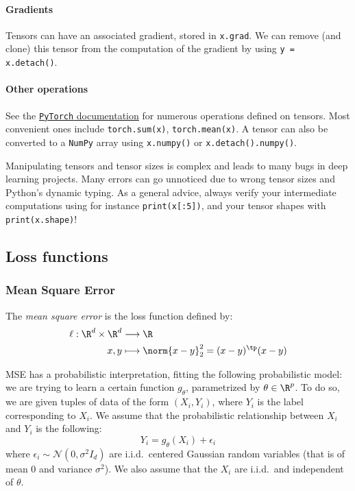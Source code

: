 \paragraph*{Gradients}
Tensors can have an associated gradient, stored in \texttt{x.grad}. We can remove (and clone) this tensor from the computation of the gradient by using \texttt{y = x.detach()}.

\paragraph*{Other operations}
See the \href{https://pytorch.org/docs/stable/tensors.html}{\texttt{PyTorch} documentation} for numerous operations defined on tensors. Most convenient ones include \texttt{torch.sum(x)}, \texttt{torch.mean(x)}. A tensor can also be converted to a \texttt{NumPy} array using \texttt{x.numpy()} or \texttt{x.detach().numpy()}.

Manipulating tensors and tensor sizes is complex and leads to many bugs in deep learning projects. Many errors can go unnoticed due to wrong tensor sizes and Python's dynamic typing. As a general advice, always verify your intermediate computations using for instance \texttt{print(x[:5])}, and your tensor shapes with \texttt{print(x.shape)}!

\subsection{Loss functions}
\subsubsection{Mean Square Error}
\begin{definition}
    The \emph{mean square error} is the loss function defined by:
    \begin{equation*}
        \begin{aligned}
            \ell : \R^d\times\R^d&\longrightarrow\R\\
            x, y&\longmapsto \norm{x-y}_2^2 = (x-y)^\tp(x-y)
        \end{aligned}
    \end{equation*}
\end{definition}

MSE has a probabilistic interpretation, fitting the following probabilistic model: we are trying to learn a certain function $g_\theta$, parametrized by $\theta\in\R^p$. To do so, we are given tuples of data of the form $(X_i, Y_i)$, where $Y_i$ is the label corresponding to $X_i$. We assume that the probabilistic relationship between $X_i$ and $Y_i$ is the following:
\begin{equation*}
    Y_i=g_\theta(X_i)+\epsilon_i
\end{equation*}
where $\epsilon_i\sim\mathcal{N}(0,\sigma^2I_d)$ are i.i.d.~centered Gaussian random variables (that is of mean 0 and variance $\sigma^2$). We also assume that the $X_i$ are i.i.d.~and independent of $\theta$.

